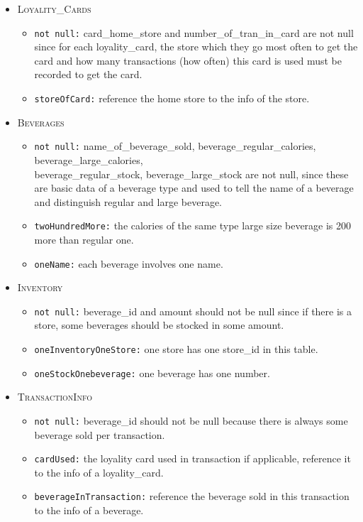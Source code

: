 \documentclass[10pt]{article}
\begin{document}
\begin{enumerate}
\begin{enumerate}
\begin{mdframed}[leftmargin=-6.5mm]
\begin{itemize}
            \item \textsc{Loyality\_Cards}
             \begin{itemize}
                 \item \texttt{not null:} card\_home\_store and number\_of\_tran\_in\_card are not null since for each loyality\_card, the store which they go most often to get the card and how many transactions (how often) this card is used must be recorded to get the card.
                 \item \texttt{storeOfCard:} reference the home store to the info of the store.
             \end{itemize}
             
            \item \textsc{Beverages}
            \begin{itemize}
                \item \texttt{not null:} name\_of\_beverage\_sold, beverage\_regular\_calories, beverage\_large\_calories,\\ beverage\_regular\_stock, beverage\_large\_stock are not null, since these are basic data of a beverage type and used to tell the name of a beverage and distinguish regular and large beverage.
                \item \texttt{twoHundredMore:} the calories of the same type large size beverage is 200 more than regular one.
                \item \texttt{oneName:} each beverage involves one name.
            \end{itemize}
            
            \item \textsc{Inventory}
            \begin{itemize}
                \item \texttt{not null:} beverage\_id and amount should not be null since if there is a store, some beverages should be stocked in some amount.
                \item \texttt{oneInventoryOneStore:} one store has one store\_id in this table.
                \item \texttt{oneStockOnebeverage:} one beverage has one number.
            \end{itemize}
            
            \item \textsc{TransactionInfo}
            \begin{itemize}
                \item \texttt{not null:} beverage\_id should not be null because there is always some beverage sold per transaction.
                \item \texttt{cardUsed:} the loyality card used in transaction if applicable, reference it to the info of a loyality\_card.
                \item \texttt{beverageInTransaction:} reference the beverage sold in this transaction to the info of a beverage.
            \end{itemize}
            

\end{itemize}
\end{mdframed}
\end{enumerate}
\end{enumerate}
\end{document}
